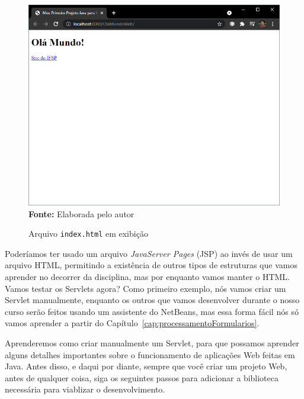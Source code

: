 \FloatBarrier
\begin{figure}[!htbp]
    \centering
    \caption{Arquivo \texttt{index.html} em exibição}
    \includegraphics[scale=0.7]{imagens/cap01OlaMundoIndex}
    \\\textbf{Fonte:} Elaborada pelo autor
    \label{fig:cap01OlaMundoIndex}
\end{figure}
\FloatBarrier

Poderíamos ter usado um arquivo \textit{JavaServer Pages} (JSP) ao invés de usar um arquivo HTML, permitindo a existência de outros tipos de estruturas que vamos aprender no decorrer da disciplina, mas por enquanto vamos manter o HTML. Vamos testar os Servlets agora? Como primeiro exemplo, nós vamos criar um Servlet manualmente, enquanto os outros que vamos desenvolver durante o nosso curso serão feitos usando um assistente do NetBeans, mas essa forma fácil nós só vamos aprender a partir do Capítulo~\ref{cap:processamentoFormularios}.

Aprenderemos como criar manualmente um Servlet, para que possamos aprender alguns detalhes importantes sobre o funcionamento de aplicações Web feitas em Java. Antes disso, e daqui por diante, sempre que você criar um projeto Web, antes de qualquer coisa, siga os seguintes passos para adicionar a biblioteca necessária para viablizar o desenvolvimento.

